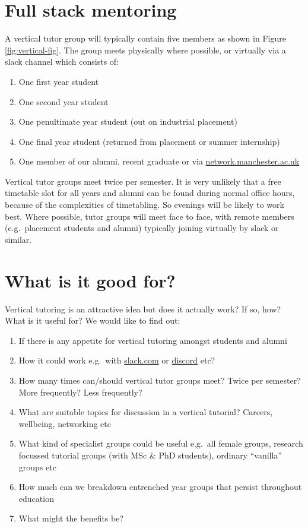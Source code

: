 \documentclass[
  12pt,
]{book}
\providecommand{\tightlist}{%
  \setlength{\itemsep}{0pt}\setlength{\parskip}{0pt}}
\begin{document}
\hypertarget{fullstack}{%
\section{Full stack mentoring}\label{fullstack}}

A vertical tutor group will typically contain five members as shown in Figure \ref{fig:vertical-fig}. The group meets physically where possible, or virtually via a slack channel which consists of:

\begin{enumerate}
\def\labelenumi{\arabic{enumi}.}
\tightlist
\item
  One first year student
\item
  One second year student
\item
  One penultimate year student (out on industrial placement)
\item
  One final year student (returned from placement or summer internship)
\item
  One member of our alumni, recent graduate or via \href{https://www.network.manchester.ac.uk/}{network.manchester.ac.uk}
\end{enumerate}

Vertical tutor groups meet twice per semester. It is very unlikely that a free timetable slot for all years and alumni can be found during normal office hours, because of the complexities of timetabling. So evenings will be likely to work best. Where possible, tutor groups will meet face to face, with remote members (e.g.~placement students and alumni) typically joining virtually by slack or similar.

\hypertarget{goodfor}{%
\section{What is it good for?}\label{goodfor}}

Vertical tutoring is an attractive idea but does it actually work? If so, how? What is it useful for? We would like to find out:

\begin{enumerate}
\def\labelenumi{\arabic{enumi}.}
\tightlist
\item
  If there is any appetite for vertical tutoring amongst students and alumni
\item
  How it could work e.g.~with \href{https://slack.com}{slack.com} or \href{https://discordapp.com/}{discord} etc?
\item
  How many times can/should vertical tutor groups meet? Twice per semester? More frequently? Less frequently?
\item
  What are suitable topics for discussion in a vertical tutorial? Careers, wellbeing, networking etc
\item
  What kind of specialist groups could be useful e.g.~all female groups, research focussed tutorial groups (with MSc \& PhD students), ordinary ``vanilla'' groups etc
\item
  How much can we breakdown entrenched year groups that persist throughout education \citep{kills1}
\item
  What might the benefits be? \citep{kills2}
\end{enumerate}
\end{document}
